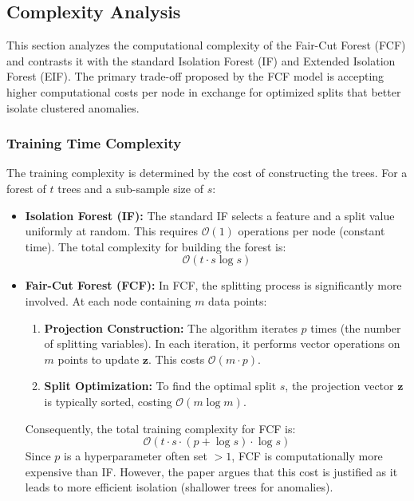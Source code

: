 \subsection{Complexity Analysis}
This section analyzes the computational complexity of the Fair-Cut Forest (FCF) and contrasts it with the standard Isolation Forest (IF) and Extended Isolation Forest (EIF). The primary trade-off proposed by the FCF model is accepting higher computational costs per node in exchange for optimized splits that better isolate clustered anomalies.

\subsubsection{Training Time Complexity}
The training complexity is determined by the cost of constructing the trees. For a forest of $t$ trees and a sub-sample size of $s$:

\begin{itemize}
    \item \textbf{Isolation Forest (IF):} The standard IF selects a feature and a split value uniformly at random. This requires $\mathcal{O}(1)$ operations per node (constant time). The total complexity for building the forest is:
    $$ \mathcal{O}(t \cdot s \log s) $$
    
    \item \textbf{Fair-Cut Forest (FCF):} In FCF, the splitting process is significantly more involved. At each node containing $m$ data points:
    \begin{enumerate}
        \item \textbf{Projection Construction:} The algorithm iterates $p$ times (the number of splitting variables). In each iteration, it performs vector operations on $m$ points to update $\mathbf{z}$. This costs $\mathcal{O}(m \cdot p)$.
        \item \textbf{Split Optimization:} To find the optimal split $s$, the projection vector $\mathbf{z}$ is typically sorted, costing $\mathcal{O}(m \log m)$.
    \end{enumerate}
    Consequently, the total training complexity for FCF is:
    $$ \mathcal{O}(t \cdot s \cdot (p + \log s) \cdot \log s) $$
    Since $p$ is a hyperparameter often set $>1$, FCF is computationally more expensive than IF. However, the paper argues that this cost is justified as it leads to more efficient isolation (shallower trees for anomalies).
\end{itemize}


